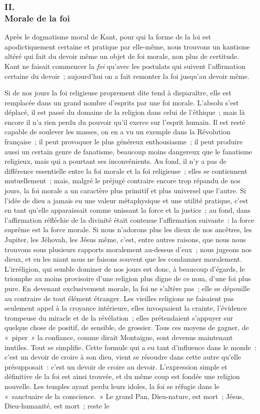 \documentclass[french,twoside]{book} %
\begin{document}
\subsubsection[{II. Morale de la foi}]{II. \\
Morale de la foi}
\noindent Après le dogmatisme moral de Kant, pour qui la forme de la loi est apodictiquement certaine et pratique par elle-même, nous trouvons un kantisme altéré qui fait du devoir même un objet de foi morale, non plus de certitude. Kant ne faisait commencer la \emph{foi} qu’avec les postulats qui suivent l’affirmation certaine du devoir ; aujourd’hui on a fait remonter la foi jusqu’au devoir même.\par
Si de nos jours la foi religieuse proprement dite tend à disparaître, elle est remplacée dans un grand nombre d’esprits par une foi morale. L’absolu s’est déplacé, il est passé du domaine de la religion dans celui de l’éthique ; mais là encore il n’a rien perdu du pouvoir qu’il exerce sur l’esprit humain. Il est resté capable de soulever les masses, on en a vu un exemple dans la Révolution française ; il peut provoquer le plus généreux enthousiasme ; il peut produire aussi un certain genre de fanatisme, beaucoup moins dangereux que le fanatisme religieux, mais qui a pourtant ses inconvénients. Au fond, il n’y a pas de différence essentielle entre la foi morale et la foi religieuse ; elles se contiennent mutuellement ; mais, malgré le préjugé contraire encore trop répandu de nos jours, la foi morale a un caractère plus primitif et plus universel que l’autre. Si l’idée de dieu a jamais eu une valeur métaphysique et une utilité pratique, c’est en tant qu’elle apparaissait comme unissant la force et la justice ; au fond, dans l’affirmation réfléchie de la divinité était contenue l’affirmation suivante : la force suprême est la force morale. Si nous n’adorons plus les dieux de nos ancêtres, les Jupiter, les Jéhovah, les Jésus même, c’est, entre autres raisons, que nous nous trouvons sous plusieurs rapports moralement au-dessus d’eux ; nous jugeons nos dieux, et en les niant nous ne faisons souvent que les condamner moralement. L’irréligion, qui semble dominer de nos jours est donc, à beaucoup d’égards, le triomphe au moins provisoire d’une religion plus digne de ce nom, d’une foi plus pure. En devenant exclusivement morale, la foi ne s’altère pas ; elle se dépouille au contraire de tout élément étranger. Les vieilles religions ne faisaient pas seulement appel à la croyance intérieure, elles invoquaient la crainte, l’évidence trompeuse du miracle et de la révélation ; elles prétendaient s’appuyer sur quelque chose de positif, de sensible, de grossier. Tous ces moyens de gagner, de « piper » la confiance, comme dirait Montaigne, sont devenus maintenant inutiles. Tout se simplifie. Cette formule qui a eu tant d’influence dans le monde : c’est un devoir de croire à son dieu, vient se résoudre dans cette autre qu’elle présupposait : c’est un devoir de croire au devoir. L’expression simple et définitive de la foi est ainsi trouvée, et du même coup est fondée une religion nouvelle. Les temples ayant perdu leurs idoles, la foi se réfugie dans le « sanctuaire de la conscience. » Le grand Pan, Dieu-nature, est mort ; Jésus, Dieu-humanité, est mort ; reste le 
\end{document}
